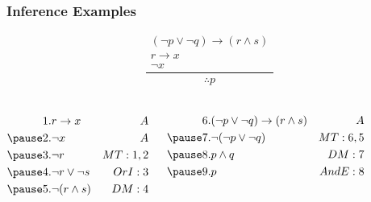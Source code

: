 \documentclass[dvipsnames]{beamer}
\begin{document}
\begin{frame}
  \frametitle{Inference Examples}

  \begin{example}
    \[
    \frac
      {
        \begin{array}{c}
          (\neg p \vee \neg q) \rightarrow (r \wedge s)\\
          r \rightarrow x\\
          \neg x
        \end{array}
      }
      {
        \therefore p
      }
    \]

    \pause
    \begin{columns}[t]
      \begin{eqnarray*}
        1. & r \rightarrow x                               & A\\
        \pause
        2. & \neg x                                        & A\\
        \pause
        3. & \neg r                                        & MT:1,2\\
        \pause
        4. & \neg r \vee \neg s                            & OrI:3\\
        \pause
        5. & \neg (r \wedge s)                             & DM:4
      \end{eqnarray*}

      \pause
      \begin{eqnarray*}
        6. & (\neg p \vee \neg q) \rightarrow (r \wedge s) & A\\
        \pause
        7. & \neg (\neg p \vee \neg q)                     & MT:6,5\\
        \pause
        8. & p \wedge q                                    & DM:7\\
        \pause
        9. & p                                             & AndE:8
      \end{eqnarray*}
    \end{columns}
  \end{example}
\end{frame}
\end{document}
